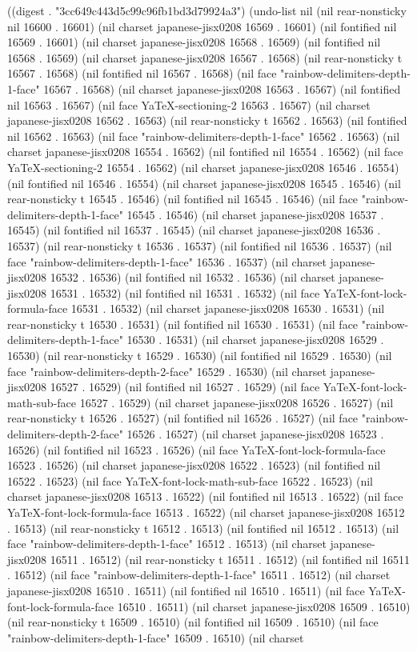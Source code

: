 
((digest . "3cc649c443d5c99c96fb1bd3d79924a3") (undo-list nil (nil rear-nonsticky nil 16600 . 16601) (nil charset japanese-jisx0208 16569 . 16601) (nil fontified nil 16569 . 16601) (nil charset japanese-jisx0208 16568 . 16569) (nil fontified nil 16568 . 16569) (nil charset japanese-jisx0208 16567 . 16568) (nil rear-nonsticky t 16567 . 16568) (nil fontified nil 16567 . 16568) (nil face "rainbow-delimiters-depth-1-face" 16567 . 16568) (nil charset japanese-jisx0208 16563 . 16567) (nil fontified nil 16563 . 16567) (nil face YaTeX-sectioning-2 16563 . 16567) (nil charset japanese-jisx0208 16562 . 16563) (nil rear-nonsticky t 16562 . 16563) (nil fontified nil 16562 . 16563) (nil face "rainbow-delimiters-depth-1-face" 16562 . 16563) (nil charset japanese-jisx0208 16554 . 16562) (nil fontified nil 16554 . 16562) (nil face YaTeX-sectioning-2 16554 . 16562) (nil charset japanese-jisx0208 16546 . 16554) (nil fontified nil 16546 . 16554) (nil charset japanese-jisx0208 16545 . 16546) (nil rear-nonsticky t 16545 . 16546) (nil fontified nil 16545 . 16546) (nil face "rainbow-delimiters-depth-1-face" 16545 . 16546) (nil charset japanese-jisx0208 16537 . 16545) (nil fontified nil 16537 . 16545) (nil charset japanese-jisx0208 16536 . 16537) (nil rear-nonsticky t 16536 . 16537) (nil fontified nil 16536 . 16537) (nil face "rainbow-delimiters-depth-1-face" 16536 . 16537) (nil charset japanese-jisx0208 16532 . 16536) (nil fontified nil 16532 . 16536) (nil charset japanese-jisx0208 16531 . 16532) (nil fontified nil 16531 . 16532) (nil face YaTeX-font-lock-formula-face 16531 . 16532) (nil charset japanese-jisx0208 16530 . 16531) (nil rear-nonsticky t 16530 . 16531) (nil fontified nil 16530 . 16531) (nil face "rainbow-delimiters-depth-1-face" 16530 . 16531) (nil charset japanese-jisx0208 16529 . 16530) (nil rear-nonsticky t 16529 . 16530) (nil fontified nil 16529 . 16530) (nil face "rainbow-delimiters-depth-2-face" 16529 . 16530) (nil charset japanese-jisx0208 16527 . 16529) (nil fontified nil 16527 . 16529) (nil face YaTeX-font-lock-math-sub-face 16527 . 16529) (nil charset japanese-jisx0208 16526 . 16527) (nil rear-nonsticky t 16526 . 16527) (nil fontified nil 16526 . 16527) (nil face "rainbow-delimiters-depth-2-face" 16526 . 16527) (nil charset japanese-jisx0208 16523 . 16526) (nil fontified nil 16523 . 16526) (nil face YaTeX-font-lock-formula-face 16523 . 16526) (nil charset japanese-jisx0208 16522 . 16523) (nil fontified nil 16522 . 16523) (nil face YaTeX-font-lock-math-sub-face 16522 . 16523) (nil charset japanese-jisx0208 16513 . 16522) (nil fontified nil 16513 . 16522) (nil face YaTeX-font-lock-formula-face 16513 . 16522) (nil charset japanese-jisx0208 16512 . 16513) (nil rear-nonsticky t 16512 . 16513) (nil fontified nil 16512 . 16513) (nil face "rainbow-delimiters-depth-1-face" 16512 . 16513) (nil charset japanese-jisx0208 16511 . 16512) (nil rear-nonsticky t 16511 . 16512) (nil fontified nil 16511 . 16512) (nil face "rainbow-delimiters-depth-1-face" 16511 . 16512) (nil charset japanese-jisx0208 16510 . 16511) (nil fontified nil 16510 . 16511) (nil face YaTeX-font-lock-formula-face 16510 . 16511) (nil charset japanese-jisx0208 16509 . 16510) (nil rear-nonsticky t 16509 . 16510) (nil fontified nil 16509 . 16510) (nil face "rainbow-delimiters-depth-1-face" 16509 . 16510) (nil charset 